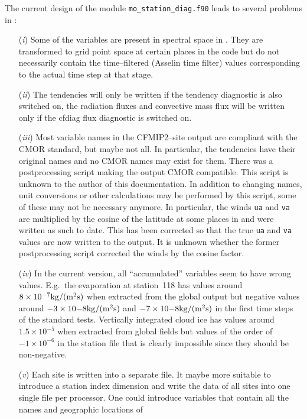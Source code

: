 \begin{appendix}
The current design of the module {\tt mo\_station\_diag.f90} leads to
several problems  
in \echam: 
\begin{itemize}
\item[({\it i}\/)] Some of the variables are present in spectral
space in \echam. They are transformed to grid point space at certain
places in the code but do not necessarily contain the time--filtered
(Asselin time filter) values corresponding to the actual time step at
that stage. 
\item[({\it ii}\/)] The tendencies will only be written if the
  tendency diagnostic is also switched on, the radiation fluxes and
  convective mass flux will be written only if the cfdiag flux
  diagnostic is switched on.
\item[({\it iii}\/)] Most variable names in the CFMIP2--site output are
  compliant with the CMOR standard, but maybe not all. In particular, the
  tendencies have their original \echam{} names and no CMOR names may
  exist for them. There was a postprocessing script
  making the output CMOR compatible. This script is unknown to the
  author of this documentation. In addition to changing names, unit
  conversions or other calculations may be performed by this script,
  some of these may not be
  necessary anymore. In particular, the winds {\tt ua} and {\tt va}
  are multiplied by the cosine of the latitude at some places in
  \echam{} and were written as such to date. This has been corrected
  so that the true {\tt ua} and {\tt va} values are now written to the
  output. It is unknown whether the former postprocessing script corrected
  the winds by the cosine factor.
\item[({\it iv}\/)] In the current version, all ``accumulated''
  variables seem to have
  wrong values. E.g.~the evaporation at station~118 has values around
  $8\times10^{-7}{\rm kg/(m^2s)}$ when extracted from the global
  \echam{} output but negative values around $-3\times10{-8}{\rm
    kg/(m^2s)}$ and $-7\times10{-8}{\rm kg/(m^2s)}$ in the first time
  steps of the standard \echam{} tests. Vertically integrated cloud
  ice has values around $1.5\times 10^{-5}$ when extracted from global
  fields but values of the order of $-1\times10^{-6}$ in the station
  file that is clearly impossible since they should be non-negative.
\item[({\it v}\/)] Each site is written into a separate file. It maybe
  more suitable to introduce a station index dimension and write the
  data of all sites into one single file per processor. One could introduce
  variables that contain all the names and geographic locations of

\end{itemize}
\end{appendix}
